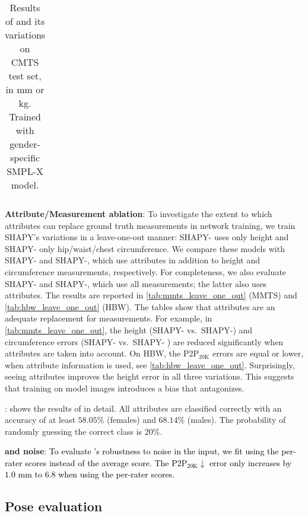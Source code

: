 \documentclass[10pt,twocolumn,letterpaper]{article}
\newcommand{\qheading}[1]{\noindent\textbf{#1}:}
\newcommand{\TODO}[1]{\xspace{\color{red} #1}\xspace}
\renewcommand{\TODO}[1]{\xspace{\color{black} #1}\xspace}
\newcommand{\modelCOLOR}{black}
\newcommand{\modelname}{{\color{\modelCOLOR}SHAPY}\xspace}
\newcommand{\colorattr}{\color{PineGreen}}
\newcommand{\colorheight}{\color{Bittersweet}}
\newcommand{\colorweight}{\color{Orange}}
\newcommand{\colorcirc}{\color{OrangeRed}}
\newcommand{\colorAHWCtoS}{\text{\mbox{{\colorattr{A}}{\colorheight{H}}{\colorweight{W}}{\colorcirc{C}}}}\xspace}
\newcommand{\colorAHWC}{\text{\mbox{{\colorattr{A}}{\colorheight{H}}{\colorweight{W}}{\colorcirc{C}}2S}}\xspace}
\newcommand{\colorAH}{\text{\mbox{{\colorattr{A}}{\colorheight{H}}}}\xspace}
\newcommand{\AtoS}{\text{\mbox{A2S}}\xspace}
\newcommand{\StoA}{\text{\mbox{S2A}}\xspace}
\newcommand{\mmts}{MMTS\xspace}
\newcommand{\cmts}{CMTS\xspace}
\newcommand{\vspaceTABaboveCaption}{-0.0 em}
\newcommand{\hbw}{\mbox{HBW}\xspace}
\newcommand{\smplx}{\mbox{SMPL-X}\xspace}
\newcommand{\vtovHD}{\mbox{$\text{P2P}_{20\text{K}}$}\xspace}
\newcommand{\cameraready}[1]{\textcolor{Fuchsia}{{#1}}\xspace}
\renewcommand{\cameraready}[1]{\textcolor{black}{{#1}}\xspace}
\begin{document}
\begin{appendices}
\begin{table}
{\begin{tabular}{llllllll}
            \bottomrule
        \end{tabular}
    }
    \vspace{\vspaceTABaboveCaption}
    \caption{
        Results of \AtoS and its variations on \cmts test set, in mm or kg. Trained with gender-specific \smplx model.
    }
    \label{supmat:tab:a2s_quant_result_cmts}
\end{table} 
\qheading{Attribute/Measurement ablation}
To investigate the extent to which attributes can replace ground truth measurements
in network training, we train \modelname's variations in a leave-one-out manner:
{\modelname-\colorheight{H}} uses only height and \modelname-{\colorcirc{C}}
only hip/waist/chest circumference.
We compare these models with \modelname-{\colorattr{A}}{\colorheight{H}} and
\modelname-{\colorattr{A}}{\colorcirc{C}},
which use attributes in addition to height and circumference measurements,
respectively. For completeness, we also evaluate
\modelname-{\colorheight{H}}{\colorcirc{C}}
and \modelname-{\colorattr{A}}{\colorheight{H}}{\colorcirc{C}},
which use all measurements; the latter also uses attributes.
The results are reported in \cref{tab:mmts_leave_one_out} (\mmts) and \cref{tab:hbw_leave_one_out} (\hbw).
\TODO{The tables show that attributes are an adequate replacement for measurements.
For example, in \cref{tab:mmts_leave_one_out}, the height
(\modelname-{\colorcirc{C}} vs.~\modelname-{\colorcirc{C}}{\colorattr{A}})
and circumference errors
(\modelname-{\colorheight{H}} vs.~\modelname-\colorAH
) are reduced significantly
when attributes are taken into account. On \hbw, the \vtovHD errors are equal or lower,
when attribute information is used, see \cref{tab:hbw_leave_one_out}.
Surprisingly, seeing attributes improves the height error in all three variations.
This suggests that training on model images introduces a bias that \AtoS antagonizes.
}

\qheading{\StoA}
 shows the results of \StoA in detail. \TODO{All attributes are classified correctly with an accuracy of at least $58.05\%$ (females) and $68.14\%$ (males). The probability of randomly guessing the correct class is 20\%.}


\qheading{\colorAHWCtoS and \colorAHWC noise}
\cameraready{To evaluate \colorAHWCtoS's robustness to noise in the input,
    we fit \colorAHWCtoS using the per-rater scores instead
    of the average score. The \vtovHD $\downarrow$ error only increases
    by $1.0$ mm to $6.8$ when using the per-rater scores.
}
\subsection{Pose evaluation}
\label{sec:pose_eval}


\end{appendices}
\end{document}

